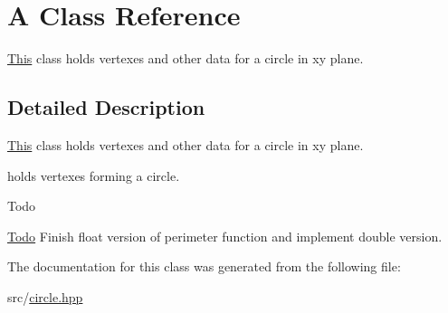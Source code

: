 \hypertarget{classA}{}\section{A Class Reference}
\label{classA}


\mbox{\hyperlink{classThis}{This}} class holds vertexes and other data for a circle in xy plane.  




\subsection{Detailed Description}
\mbox{\hyperlink{classThis}{This}} class holds vertexes and other data for a circle in xy plane. 

holds vertexes forming a circle. \begin{DoxyRefDesc}{Todo}
\item[\mbox{\hyperlink{todo__todo000001}{Todo}}]Finish float version of perimeter function and implement double version. \end{DoxyRefDesc}


The documentation for this class was generated from the following file\+:\begin{DoxyCompactItemize}
\item 
src/\mbox{\hyperlink{circle_8hpp}{circle.\+hpp}}\end{DoxyCompactItemize}
